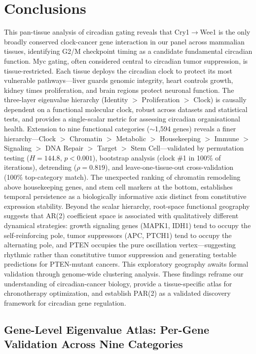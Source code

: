 \documentclass[11pt,letterpaper]{article}
\begin{document}
\section{Conclusions}

This pan-tissue analysis of circadian gating reveals that Cry1$\rightarrow$Wee1 is the only broadly conserved clock-cancer gene interaction in our panel across mammalian tissues, identifying G2/M checkpoint timing as a candidate fundamental circadian function. Myc gating, often considered central to circadian tumor suppression, is tissue-restricted. Each tissue deploys the circadian clock to protect its most vulnerable pathways---liver guards genomic integrity, heart controls growth, kidney times proliferation, and brain regions protect neuronal function. The three-layer eigenvalue hierarchy (Identity $>$ Proliferation $>$ Clock) is causally dependent on a functional molecular clock, robust across datasets and statistical tests, and provides a single-scalar metric for assessing circadian organisational health. Extension to nine functional categories ($\sim$1,594 genes) reveals a finer hierarchy---Clock $>$ Chromatin $>$ Metabolic $>$ Housekeeping $>$ Immune $>$ Signaling $>$ DNA Repair $>$ Target $>$ Stem Cell---validated by permutation testing ($H=144.8$, $p<0.001$), bootstrap analysis (clock \#1 in 100\% of iterations), detrending ($\rho = 0.819$), and leave-one-tissue-out cross-validation (100\% top-category match). The unexpected ranking of chromatin remodeling above housekeeping genes, and stem cell markers at the bottom, establishes temporal persistence as a biologically informative axis distinct from constitutive expression stability. Beyond the scalar hierarchy, root-space functional geography suggests that AR(2) coefficient space is associated with qualitatively different dynamical strategies: growth signaling genes (MAPK1, IDH1) tend to occupy the self-reinforcing pole, tumor suppressors (APC, PTCH1) tend to occupy the alternating pole, and PTEN occupies the pure oscillation vertex---suggesting rhythmic rather than constitutive tumor suppression and generating testable predictions for PTEN-mutant cancers. This exploratory geography awaits formal validation through genome-wide clustering analysis. These findings reframe our understanding of circadian-cancer biology, provide a tissue-specific atlas for chronotherapy optimization, and establish PAR(2) as a validated discovery framework for circadian gene regulation.

\subsection{Gene-Level Eigenvalue Atlas: Per-Gene Validation Across Nine Categories}
\end{document}
